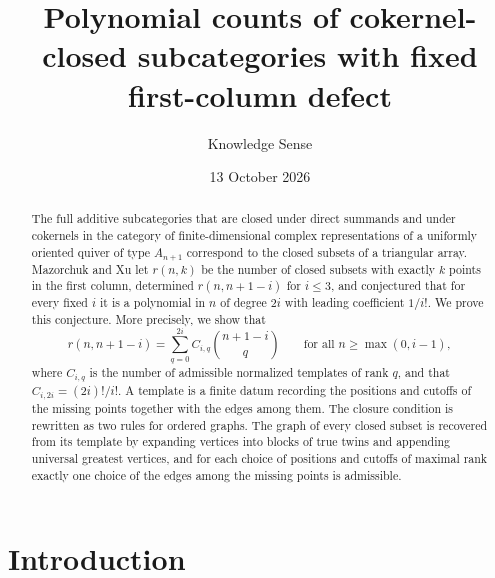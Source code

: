 \documentclass[11pt]{amsart}
\theoremstyle{definition}
\theoremstyle{remark}
\numberwithin{equation}{section}
\begin{document}
\title[Cokernel-closed subcategories with fixed defect]{Polynomial counts of cokernel-closed subcategories with fixed first-column defect}

\author{Knowledge Sense}

\date{13 October 2026}



\begin{abstract}
The full additive subcategories that are closed under direct summands and under cokernels in the category of finite-dimensional complex representations of a uniformly oriented quiver of type $A_{n+1}$ correspond to the closed subsets of a triangular array. Mazorchuk and Xu let $r(n,k)$ be the number of closed subsets with exactly $k$ points in the first column, determined $r(n,n+1-i)$ for $i\le 3$, and conjectured that for every fixed $i$ it is a polynomial in $n$ of degree $2i$ with leading coefficient $1/i!$. We prove this conjecture. More precisely, we show that
\[
r(n,n+1-i)=\sum_{q=0}^{2i}C_{i,q}\binom{n+1-i}{q}\qquad\text{for all } n\ge\max(0,i-1),
\]
where $C_{i,q}$ is the number of admissible normalized templates of rank $q$, and that $C_{i,2i}=(2i)!/i!$. A template is a finite datum recording the positions and cutoffs of the missing points together with the edges among them. The closure condition is rewritten as two rules for ordered graphs. The graph of every closed subset is recovered from its template by expanding vertices into blocks of true twins and appending universal greatest vertices, and for each choice of positions and cutoffs of maximal rank exactly one choice of the edges among the missing points is admissible.
\end{abstract}

\maketitle

\section{Introduction}
\end{document}
